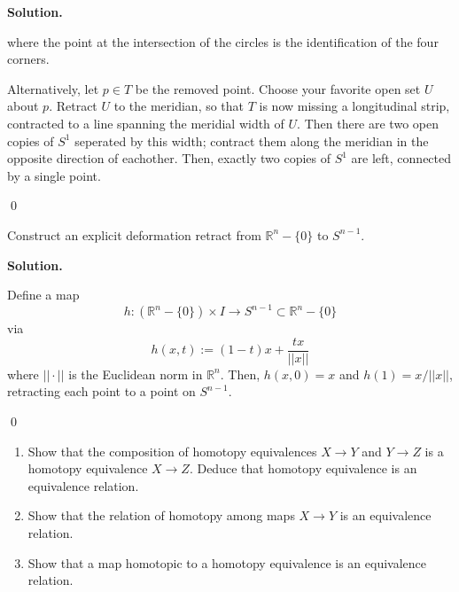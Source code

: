 \documentclass[12pt]{book}
\newcommand{\R}{\mathbb{R}}        %
\theoremstyle{definition}
\newenvironment{solution}
{%
  \par\noindent\textbf{Solution.}\quad
}
{%
  \qed\par
}
{
  \vspace{2pt}
}
\begin{document}
\begin{solution}
\begin{center}
  \end{center}
  where the point at the intersection of the circles is the identification of the four corners.

  Alternatively, let $p \in T$ be the removed point.
  Choose your favorite open set $U$ about $p$.
  Retract $U$ to the meridian, so that $T$ is now missing a longitudinal strip, contracted to  a line spanning the meridial width of $U$.
  Then there are two open copies of $S^1$ seperated by this width; contract them along the meridian in the opposite direction of eachother.
  Then, exactly two copies of $S^1$ are left, connected by a single point.

\end{solution}

\begin{taggedexercise}[\textcolor{green}{Complete}]
  Construct an explicit deformation retract from $\R^n - \{0\}$ to $S^{n-1}$.
\end{taggedexercise}
\begin{solution}
  Define a map 
  \[h: \left(\R^n - \{0\}\right) \times I \longrightarrow S^{n-1} \subset \R^n - \{0\}\]
  via 
  \[h(x, t):= (1-t)x + \frac{tx}{||x||}\]
  where $||\cdot ||$ is the Euclidean norm in $\R^n$.
  Then, $h(x, 0) = x$ and $h(1) = x/||x||$, retracting each point to a point on $S^{n-1}$.

\end{solution}

\begin{taggedexercise}[\textcolor{green}{Complete}]
  \begin{enumerate}
    \item Show that the composition of homotopy equivalences $X \to Y$ and $Y \to Z$ is a homotopy equivalence $X \to Z$.
          Deduce that homotopy equivalence is an equivalence relation.
    \item Show that the relation of homotopy among maps $X \to Y$ is an equivalence relation.
    \item Show that a map homotopic to a homotopy equivalence is an equivalence relation.
  \end{enumerate}
\end{taggedexercise}
\end{document}
